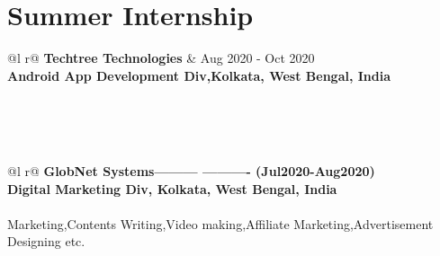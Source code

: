 \documentclass[a4paper,12pt]{article}
\begin{document}
\section{Summer Internship}


\begin{tabularx}{\linewidth}{ @{}l r@{} }
\textbf{Techtree Technologies} & \hfill Aug 2020 - Oct 2020 \\[3.75pt]
\textbf{Android App Development Div,Kolkata, West Bengal, India} \\[3.75pt]
  \\[3.75pt]
\end{tabularx}     \\
\\










\begin{tabularx}{\linewidth}{ @{}l r@{} }
\textbf{GlobNet Systems---------                   ---------- (Jul2020-Aug2020)}\\[0.72pt]
\textbf{Digital Marketing Div, Kolkata, West Bengal, India} \\[3.75pt]
  \\[3.75pt]
Marketing,Contents Writing,Video making,Affiliate Marketing,Advertisement Designing etc.
\end{tabularx}



\end{document}
